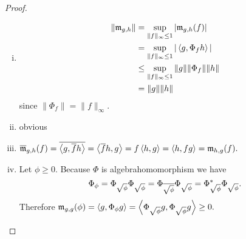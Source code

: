 \begin{proof}
 \begin{enumerate}[(i)]
  \item \begin{align*}
         \| \mathfrak{m}_{g,h} \| &= \sup\limits_{\| f \| _\infty \leq 1} | \mathfrak{m}_{g,h}(f) | \\
			&= \sup\limits_{\| f \| _\infty \leq 1} | \left\langle g, \Phi_f h \right\rangle | \\
			&\leq \sup\limits_{\| f \| _\infty \leq 1} \| g \| \|\Phi_f \| \| h\| \\
			&= \|g\| \|h\|
        \end{align*}
  since $\|\Phi_f \| =\| f \|_\infty$.
 \item obvious
 \item $\overline{\mathfrak{m}}_{g,h}(f) = \overline{\left\langle g, \overline{f}h \right\rangle} = \left\langle \overline{f}h ,g \right\rangle =
 f\left\langle h,g \right\rangle = \left\langle h, fg \right\rangle = \mathfrak{m}_{h,g}(f).$
 \item Let $\phi \geq 0$. Because $\Phi$ is algebrahomomorphism we have 
 \[
  \Phi_\phi = \Phi_{\sqrt{\phi}} \Phi_{\sqrt{\phi}} = 
  \Phi_{\overline{\sqrt{\phi}}} \Phi_{\sqrt{\phi}} =
  \Phi_{\sqrt{\phi}}^{*} \Phi_{\sqrt{\phi}}.
 \]
 Therefore $\mathfrak{m}_{g,g}(\phi) = \left\langle g, \Phi_\phi g \right\rangle = \left\langle \Phi_{\sqrt{\phi}}g,
 \Phi_{\sqrt{\phi}}g \right\rangle \geq 0. $

\end{enumerate}
\end{proof}






